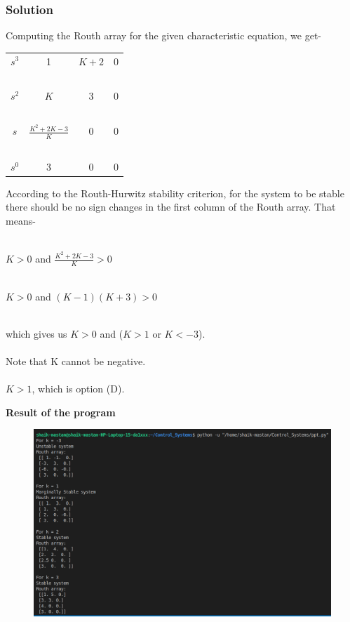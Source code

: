 \documentclass{beamer}
\begin{document}
\begin{frame}
\frametitle{\textbf{Solution}}
Computing the Routh array for the given characteristic equation, we get-

\begin{center}
\begin{tabular}{ c c c c }
 \(s^3\) & 1 & \(K+2\) & 0 \\~\\
 \(s^2\) & \(K\) & 3 & 0 \\~\\  
 \(s\) & \(\frac{K^2+2K-3}{K}\) & 0 & 0 \\~\\
 \(s^0\) & 3 & 0 & 0
\end{tabular}
\end{center}
\end{frame}

\begin{frame}
According to the Routh-Hurwitz stability criterion, for the system to be stable there should be no sign changes in the first column of the Routh array. That means- \\~\\
\begin{center}
\(K > 0\)  and  \(\frac{K^2+2K-3}{K} > 0\) \\~\\
\end{center}
\begin{center}
\Rightarrow \(K > 0\)  and  \((K-1)(K+3) > 0\) \\~\\
\end{center}
which gives us \(K > 0\) and (\(K > 1\) or \(K < -3\)). \\~\\
Note that K cannot be negative. \\~\\
\Rightarrow \(K > 1\), which is option (D). 
\end{frame}

\begin{frame}{\textbf{Result of the program}}
\begin{figure}
    \includegraphics[scale = 0.27]{Terminal.png}
\end{figure}
\end{frame}
\end{document}
